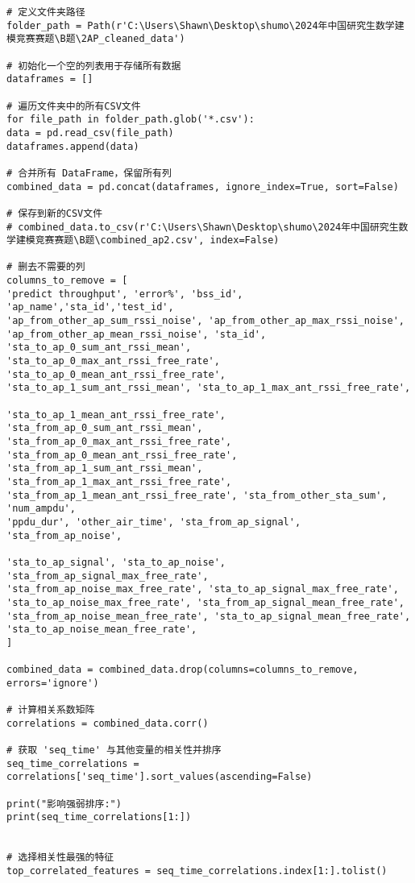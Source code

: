 \documentclass[bwprint]{gmcmthesis}
\begin{document}
\begin{lstlisting}
# 定义文件夹路径
folder_path = Path(r'C:\Users\Shawn\Desktop\shumo\2024年中国研究生数学建模竞赛赛题\B题\2AP_cleaned_data')

# 初始化一个空的列表用于存储所有数据
dataframes = []

# 遍历文件夹中的所有CSV文件
for file_path in folder_path.glob('*.csv'):
data = pd.read_csv(file_path)
dataframes.append(data)

# 合并所有 DataFrame，保留所有列
combined_data = pd.concat(dataframes, ignore_index=True, sort=False)

# 保存到新的CSV文件
# combined_data.to_csv(r'C:\Users\Shawn\Desktop\shumo\2024年中国研究生数学建模竞赛赛题\B题\combined_ap2.csv', index=False)

# 删去不需要的列
columns_to_remove = [
'predict throughput', 'error%', 'bss_id', 'ap_name','sta_id','test_id',
'ap_from_other_ap_sum_rssi_noise', 'ap_from_other_ap_max_rssi_noise',
'ap_from_other_ap_mean_rssi_noise', 'sta_id', 'sta_to_ap_0_sum_ant_rssi_mean',
'sta_to_ap_0_max_ant_rssi_free_rate', 'sta_to_ap_0_mean_ant_rssi_free_rate',
'sta_to_ap_1_sum_ant_rssi_mean', 'sta_to_ap_1_max_ant_rssi_free_rate',

'sta_to_ap_1_mean_ant_rssi_free_rate', 'sta_from_ap_0_sum_ant_rssi_mean',
'sta_from_ap_0_max_ant_rssi_free_rate', 'sta_from_ap_0_mean_ant_rssi_free_rate',
'sta_from_ap_1_sum_ant_rssi_mean', 'sta_from_ap_1_max_ant_rssi_free_rate',
'sta_from_ap_1_mean_ant_rssi_free_rate', 'sta_from_other_sta_sum', 'num_ampdu',
'ppdu_dur', 'other_air_time', 'sta_from_ap_signal', 'sta_from_ap_noise',

'sta_to_ap_signal', 'sta_to_ap_noise', 'sta_from_ap_signal_max_free_rate',
'sta_from_ap_noise_max_free_rate', 'sta_to_ap_signal_max_free_rate',
'sta_to_ap_noise_max_free_rate', 'sta_from_ap_signal_mean_free_rate',
'sta_from_ap_noise_mean_free_rate', 'sta_to_ap_signal_mean_free_rate',
'sta_to_ap_noise_mean_free_rate',
]

combined_data = combined_data.drop(columns=columns_to_remove, errors='ignore')

# 计算相关系数矩阵
correlations = combined_data.corr()

# 获取 'seq_time' 与其他变量的相关性并排序
seq_time_correlations = correlations['seq_time'].sort_values(ascending=False)

print("影响强弱排序:")
print(seq_time_correlations[1:])


# 选择相关性最强的特征
top_correlated_features = seq_time_correlations.index[1:].tolist()


\end{lstlisting}
\end{document}
